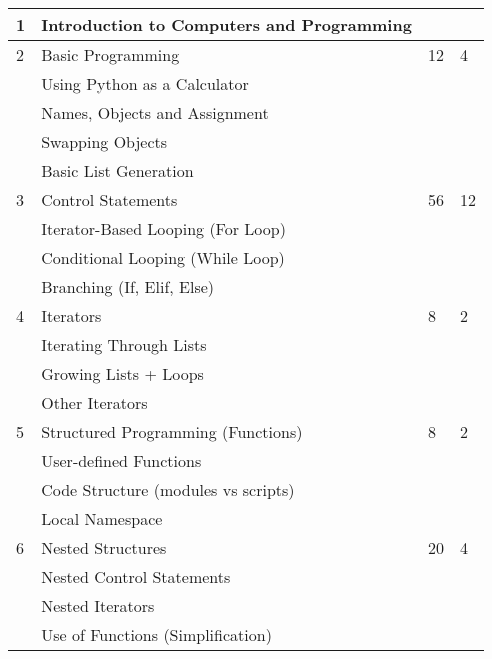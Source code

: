 \begin{longtable}{|p{1.4cm}|p{8.4cm}|p{2.2cm}|p{1.8cm}|}
             1  & Introduction to Computers and Programming  &    &    \\
             \hline
             2  & Basic Programming                          & 12 & 4  \\
                & \qquad Using Python as a Calculator        &    &    \\
                & \qquad Names, Objects and Assignment       &    &    \\
                & \qquad Swapping Objects                    &    &    \\
                & \qquad Basic List Generation               &    &    \\
             \hline
             3  & Control Statements                         & 56 & 12 \\
                & \qquad Iterator-Based Looping (For Loop)   &    &    \\
                & \qquad Conditional Looping (While Loop)    &    &    \\
                & \qquad Branching (If, Elif, Else)          &    &    \\
             \hline
             4  & Iterators                                  &  8 & 2  \\
                & \qquad Iterating Through Lists             &    &    \\
                & \qquad Growing Lists + Loops               &    &    \\
                & \qquad Other Iterators                     &    &    \\
             \hline
             5  & Structured Programming (Functions)         &  8 & 2  \\
                & \qquad User-defined Functions              &    &    \\
                & \qquad Code Structure (modules vs scripts) &    &    \\
                & \qquad Local Namespace                     &    &    \\
             \hline
             6  & Nested Structures                          & 20 & 4  \\
                & \qquad Nested Control Statements           &    &    \\
                & \qquad Nested Iterators                    &    &    \\
                & \qquad Use of Functions (Simplification)   &    &    \\

\end{longtable}
